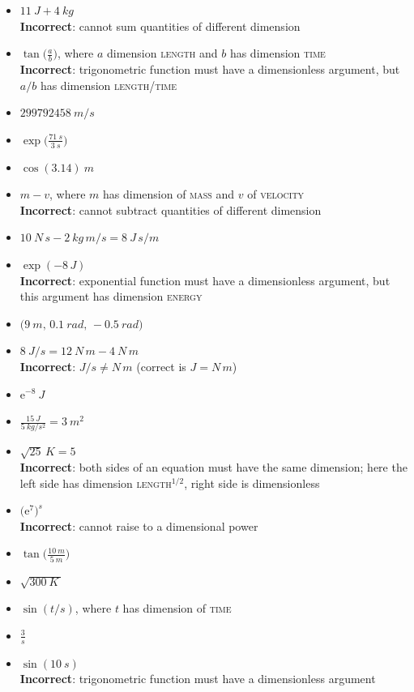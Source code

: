 \documentclass[a4paper,12pt,%
onecolumn,oneside,%
british%
]{memoir}
\newcommand*{\e}{\ensuremath{\mathrm{e}}}
\renewcommand*{\|}[1][]{\nonscript\:#1\vert\nonscript\:\mathopen{}}
\begin{document}
\begin{itemize}[label=$\triangleright$\enskip,itemsep=1ex]
\item $\displaystyle\qty{11}{J} + \qty{4}{kg}$\\%
  \textbf{Incorrect}: cannot sum quantities of different dimension
\item $\displaystyle\tan\biggl(\frac{a}{b}\biggr)$, where $a$ dimension \textsc{length} and $b$ has dimension \textsc{time}\\%
  \textbf{Incorrect}: trigonometric function must have a dimensionless argument, but $a/b$ has dimension \textsc{length}/\textsc{time}
\item $\displaystyle\qty{299792458}{m/s}$
\item $\displaystyle\exp\biggl(\frac{\qty{71}{s}}{\qty{3}{s}}\biggr)$
\item $\displaystyle\cos(\num{3.14})\:\unit{m}$
\item $\displaystyle m - v$, where $m$ has dimension of \textsc{mass} and $v$ of \textsc{velocity}\\%
  \textbf{Incorrect}: cannot subtract quantities of different dimension
\item $\displaystyle \qty{10}{N\, s}-\qty{2}{kg\, m/s} = \qty{8}{J\, s/m}$
\item $\displaystyle\exp(-8\,\unit{J})$\\%
  \textbf{Incorrect}: exponential function must have a dimensionless argument, but this argument has dimension \textsc{energy}
\item $\displaystyle\bigl(\qty{9}{m},\, \qty{0.1}{rad},\, -\qty{0.5}{rad}\bigr)$
\item $\displaystyle\qty{8}{J/s}=\qty{12}{N\,m}-\qty{4}{N\,m}$\\%
  \textbf{Incorrect}: $\unit{J/s} \ne \unit{N\,m}$ (correct is $\unit{J} = \unit{N\,m}$)
\item $\displaystyle\e^{-8}\:\unit{J}$
\item $\displaystyle\frac{\qty{15}{J}}{\qty{5}{kg/s^{2}}} = \qty{3}{m^{2}}$
\item $\displaystyle \sqrt{25}\,\unit{K} = 5$\\%
  \textbf{Incorrect}: both sides of an equation must have the same dimension; here the left side has dimension \textsc{length}${}^{1/2}$, right side is dimensionless
\item $\displaystyle\bigl(\e^{7}\bigr)^{\unit{s}}$\\%
  \textbf{Incorrect}: cannot raise to a dimensional power
\item $\displaystyle\tan\biggl(\frac{\qty{10}{m}}{\qty{5}{m}}\biggr)$
\item $\displaystyle\sqrt{\qty{300}{K}\,}$
\item $\displaystyle\sin(t/\unit{s})$, where $t$ has dimension of \textsc{time}
\item $\displaystyle\frac{3}{\unit{s}}$
\item $\displaystyle\sin(\qty{10}{s})$\\%
  \textbf{Incorrect}: trigonometric function must have a dimensionless argument
\end{itemize}
\end{document}
